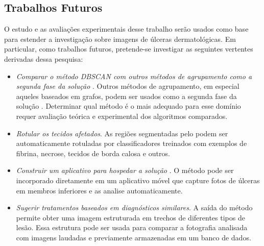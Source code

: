 \subsection{Trabalhos Futuros}

O estudo e as avaliações experimentais desse trabalho serão usados como base para estender a investigação sobre imagens de úlceras dermatológicas.
Em particular, como trabalhos futuros, pretende-se investigar as seguintes vertentes derivadas dessa pesquisa:

\begin{itemize}
    
    \item \textit{Comparar o método DBSCAN com outros métodos de agrupamento como a segunda fase da solução \system}. 
    Outros métodos de agrupamento, em especial aqueles baseados em grafos, podem ser usados como a segunda fase da solução \system. 
    Determinar qual método é o mais adequado para esse domínio requer avaliação teórica e experimental dos algoritmos comparados.
    
    
    \item \textit{Rotular os tecidos afetados}.
    As regiões segmentadas pelo \system podem ser automaticamente rotuladas por classificadores treinados com exemplos de fibrina, necrose, tecidos de borda calosa e outros. 
     
    \item \textit{Construir um aplicativo para hospedar a solução \system}.
    O método \system pode ser incorporado diretamente em um aplicativo móvel que capture fotos de úlceras em membros inferiores e as analise automaticamente.
    
    \item \textit{Sugerir tratamentos baseados em diagnósticos similares}.
    A saída do método \system permite obter uma imagem estruturada em trechos de diferentes tipos de lesão.
    Essa estrutura pode ser usada para comparar a fotografia analisada com imagens laudadas e previamente armazenadas em um banco de dados.
    
\end{itemize}

